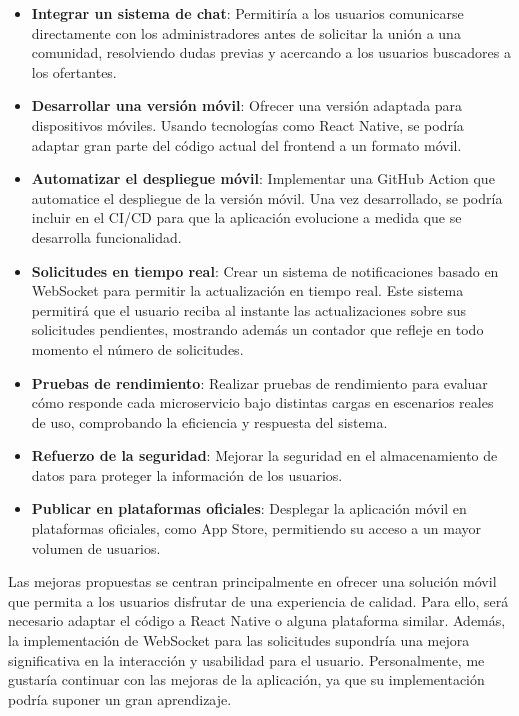 \begin{itemize}
    \item \textbf{Integrar un sistema de chat}: Permitiría a los usuarios comunicarse directamente con los administradores antes de solicitar la unión a una comunidad, resolviendo dudas previas y acercando a los usuarios buscadores a los ofertantes.
    \item \textbf{Desarrollar una versión móvil}: Ofrecer una versión adaptada para dispositivos móviles. Usando tecnologías como React Native, se podría adaptar gran parte del código actual del frontend a un formato móvil.
    \item \textbf{Automatizar el despliegue móvil}: Implementar una GitHub Action que automatice el despliegue de la versión móvil. Una vez desarrollado, se podría incluir en el CI/CD para que la aplicación evolucione a medida que se desarrolla funcionalidad.
    \item \textbf{Solicitudes en tiempo real}: Crear un sistema de notificaciones basado en WebSocket para permitir la actualización en tiempo real. Este sistema permitirá que el usuario reciba al instante las actualizaciones sobre sus solicitudes pendientes, mostrando además un contador que refleje en todo momento el número de solicitudes.
    \item \textbf{Pruebas de rendimiento}: Realizar pruebas de rendimiento para evaluar cómo responde cada microservicio bajo distintas cargas en escenarios reales de uso, comprobando la eficiencia y respuesta del sistema.
    \item \textbf{Refuerzo de la seguridad}: Mejorar la seguridad en el almacenamiento de datos para proteger la información de los usuarios.
    \item \textbf{Publicar en plataformas oficiales}: Desplegar la aplicación móvil en plataformas oficiales, como App Store, permitiendo su acceso a un mayor volumen de usuarios.
\end{itemize}

\vspace{0.5em}
Las mejoras propuestas se centran principalmente en ofrecer una solución móvil que permita a los usuarios disfrutar de una experiencia de calidad. Para ello, será necesario adaptar el código a React Native o alguna plataforma similar. Además, la implementación de WebSocket para las solicitudes supondría una mejora significativa en la interacción y usabilidad para el usuario. Personalmente, me gustaría continuar con las mejoras de la aplicación, ya que su implementación podría suponer un gran aprendizaje.
